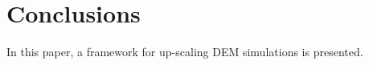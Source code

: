 \section{Conclusions}
In this paper, a framework for up-scaling DEM simulations is presented. 













\clearpage